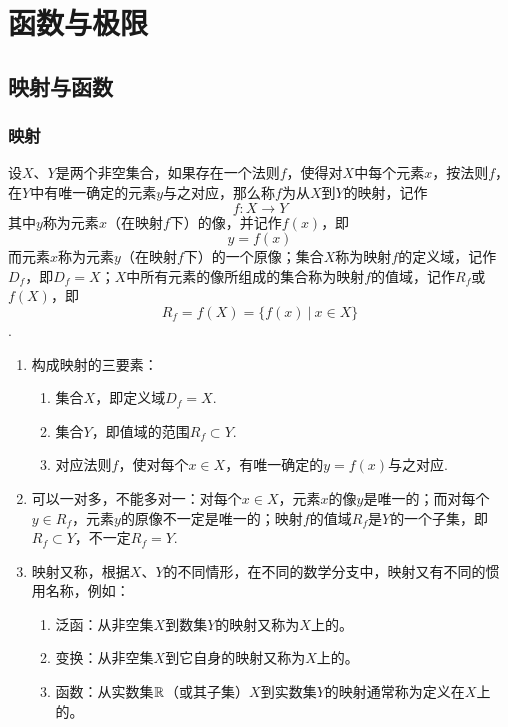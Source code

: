 \chapter{函数与极限}

\section{映射与函数}

\subsection{映射}

\begin{definition}
	设\(X\)、\( Y \)是两个非空集合，如果存在一个法则\( f \)，使得对\( X \)中每个元素\( x \)，按法则\( f \)，在\( Y \)中有唯一确定的元素\( y \)与之对应，那么称\( f \)为从\( X \)到\( Y \)的映射，记作
	\[ f:X \rightarrow Y \]
	其中\( y \)称为元素\( x \)（在映射\( f \)下）的像，并记作\( f(x) \)，即
	\[ y = f(x) \]
	而元素\( x \)称为元素\( y \)（在映射\( f \)下）的一个原像；集合\( X \)称为映射\( f \)的定义域，记作\( D_{f} \)，即\( D_{f} = X \)；\( X \)中所有元素的像所组成的集合称为映射\( f \)的值域，记作\( R_{f} \)或\( f(X) \)，即
	\[ R_{f} = f(X) = \{ f(x)\ |\ x \in X\}\].
\end{definition}

\begin{note}
	\begin{enumerate}
		\item 构成映射的{\heiti 三要素}：
		\begin{enumerate}
			\item 集合\( X \)，即{\heiti 定义域}\( D_{f} = X \).
			\item 集合\( Y \)，即{\heiti 值域}的范围\( R_{f} \subset Y \).
			\item {\heiti 对应法则\( f \)}，使对每个\( x \in X \)，有唯一确定的\( y = f(x) \)与之对应.
		\end{enumerate}
		\item 可以一对多，不能多对一：对每个\( x \in X \)，元素\( x \)的像\( y \)是唯一的；而对每个\( y \in R_{f} \)，元素\( y \)的原像不一定是唯一的；映射\( f \)的值域\( R_{f} \)是\( Y \)的一个子集，即\( R_{f} \subset Y \)，不一定\( R_{f} = Y \).
		\item 映射又称，根据\( X \)、\( Y \)的不同情形，在不同的数学分支中，映射又有不同的惯用名称，例如：
		\begin{enumerate}
			\item {\heiti 泛函}：从非空集\( X \)到数集\( Y \)的映射又称为\( X \)上的。
			\item {\heiti 变换}：从非空集\( X \)到它自身的映射又称为\( X \)上的。
			\item {\heiti 函数}：从实数集\( \mathbb{R} \)（或其子集）\( X \)到实数集\( Y \)的映射通常称为定义在\( X \)上的。
		\end{enumerate}
	\end{enumerate}
\end{note}

